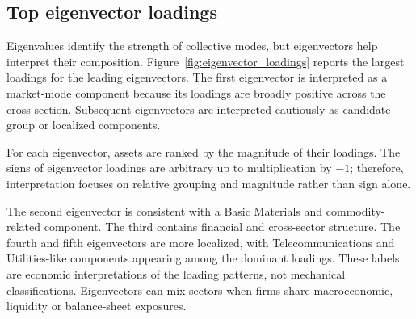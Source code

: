\subsection{Top eigenvector loadings}

Eigenvalues identify the strength of collective modes, but eigenvectors help interpret their composition. Figure~\ref{fig:eigenvector_loadings} reports the largest loadings for the leading eigenvectors. The first eigenvector is interpreted as a market-mode component because its loadings are broadly positive across the cross-section. Subsequent eigenvectors are interpreted cautiously as candidate group or localized components.

For each eigenvector, assets are ranked by the magnitude of their loadings. The signs of eigenvector loadings are arbitrary up to multiplication by $-1$; therefore, interpretation focuses on relative grouping and magnitude rather than sign alone.

The second eigenvector is consistent with a Basic Materials and commodity-related component. The third contains financial and cross-sector structure. The fourth and fifth eigenvectors are more localized, with Telecommunications and Utilities-like components appearing among the dominant loadings. These labels are economic interpretations of the loading patterns, not mechanical classifications. Eigenvectors can mix sectors when firms share macroeconomic, liquidity or balance-sheet exposures.
